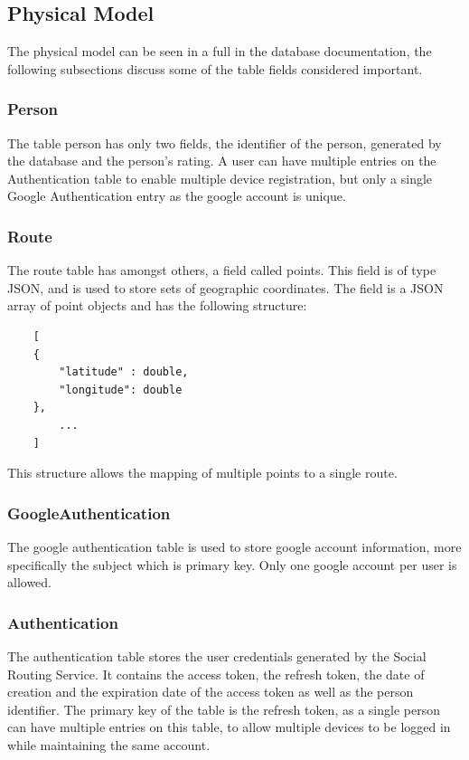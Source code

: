     \subsection{Physical Model}
    The physical model can be seen in a full in the database documentation\cite{servicedbms}, the following subsections discuss 
    some of the table fields considered important.

        \subsubsection*{Person}
        The table person has only two fields, the identifier of the person, generated by the database and the person's rating.
        A user can have multiple entries on the Authentication table to enable multiple device registration, 
        but only a single Google Authentication entry as the google account is unique.

        \subsubsection*{Route}
        The route table has amongst others, a field called points. This field is of type JSON, and is used to store sets of geographic
        coordinates. The field is a JSON array of point objects and has the following structure:
            \begin{lstlisting}
    [    
    {
        "latitude" : double,
        "longitude": double
    },
        ...
    ]
            \end{lstlisting}
        This structure allows the mapping of multiple points to a single route.

        \subsubsection*{GoogleAuthentication}
        The google authentication table is used to store google account information, more specifically the subject which is primary
        key. Only one google account per user is allowed.

        \subsubsection*{Authentication}
        The authentication table stores the user credentials generated by the Social Routing Service. It contains the access token, the refresh
        token, the date of creation and the expiration date of the access token as well as the person identifier. The primary key of the table is the refresh token, as a single
        person can have multiple entries on this table, to allow multiple devices to be logged in while maintaining the same account.


